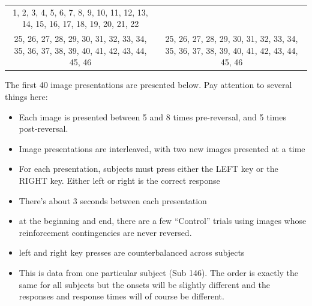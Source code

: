 \documentclass[]{article}
\providecommand{\tightlist}{%
  \setlength{\itemsep}{0pt}\setlength{\parskip}{0pt}}
\begin{document}
\begin{longtable}[]{@{}cc@{}}
\begin{minipage}[t]{0.43\columnwidth}
1, 2, 3, 4, 5, 6, 7, 8, 9, 10, 11, 12, 13, 14, 15, 16, 17, 18, 19, 20,
21, 22\strut
\end{minipage}\tabularnewline
\begin{minipage}[t]{0.43\columnwidth}\centering\strut
25, 26, 27, 28, 29, 30, 31, 32, 33, 34, 35, 36, 37, 38, 39, 40, 41, 42,
43, 44, 45, 46\strut
\end{minipage} & \begin{minipage}[t]{0.43\columnwidth}\centering\strut
25, 26, 27, 28, 29, 30, 31, 32, 33, 34, 35, 36, 37, 38, 39, 40, 41, 42,
43, 44, 45, 46\strut
\end{minipage}\tabularnewline
\bottomrule
\end{longtable}

The first 40 image presentations are presented below. Pay attention to
several things here:

\begin{itemize}
\tightlist
\item
  Each image is presented between 5 and 8 times pre-reversal, and 5
  times post-reversal.
\item
  Image presentations are interleaved, with two new images presented at
  a time
\item
  For each presentation, subjects must press either the LEFT key or the
  RIGHT key. Either left or right is the correct response
\item
  There's about 3 seconds between each presentation
\item
  at the beginning and end, there are a few ``Control'' trials using
  images whose reinforcement contingencies are never reversed.
\item
  left and right key presses are counterbalanced across subjects
\item
  This is data from one particular subject (Sub 146). The order is
  exactly the same for all subjects but the onsets will be slightly
  different and the responses and response times will of course be
  different.
\end{itemize}
\end{document}
